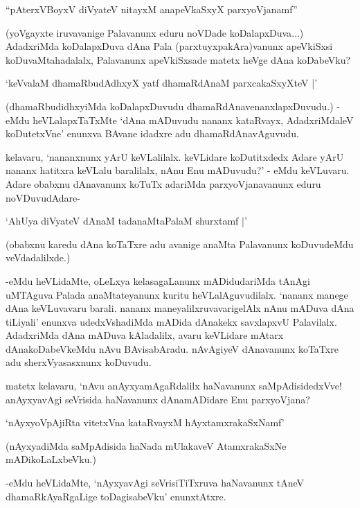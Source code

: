 \begin{shloka}
``pAterxVBoyxV diVyateV nitayxM anapeVkaSxyX parxyoVjanamf''
\end{shloka}

(yoVgayxte iruvavanige Palavanunx eduru noVDade koDalapxDuva$\ldots$) AdadxriMda koDalapxDuva dAna Pala (parxtuyxpakAra)vanunx apeVkiSxsi koDuvaMtahadalalx, Palavanunx apeVkiSxsade matetx heVge dAna koDabeVku?

\begin{shloka}
`keVvalaM dhamaRbudAdhxyX yatf dhamaRdAnaM parxcakaSxyXteV |'
\end{shloka}

(dhamaRbudidhxyiMda koDalapxDuvudu dhamaRdAnavenanxlapxDuvudu.) - eMdu heVLalapxTaTxMte `dAna mADuvudu nananx kataRvayx, AdadxriMdaleV koDutetxVne' enunxva BAvane idadxre adu dhamaRdAnavAguvudu.

kelavaru, `nananxnunx yArU keVLalilalx. keVLidare koDutitxdedx Adare yArU nananx hatitxra keVLalu baralilalx, nAnu Enu mADuvudu?' - eMdu keVLuvaru. Adare obabxnu dAnavanunx koTuTx adariMda parxyoVjanavanunx eduru noVDuvudAdare-

\begin{shloka}
`AhUya diVyateV dAnaM tadanaMtaPalaM shurxtamf |'
\end{shloka}

(obabxnu karedu dAna koTaTxre adu avanige anaMta Palavanunx koDuvudeMdu veVdadalilxde.)

-eMdu heVLidaMte, oLeLxya kelasagaLanunx mADidudariMda tAnAgi uMTAguva Palada anaMtateyanunx kuritu heVLalAguvudilalx. `nananx manege dAna keVLuvavaru barali. nananx maneyalilxruvavarigelAlx nAnu mADuva dAna tiLiyali' enunxva udedxVshadiMda mADida dAnakekx savxlapxvU Palavilalx. AdadxriMda dAna mADuva kAladalilx, avaru keVLidare mAtarx dAnakoDabeVkeMdu nAvu BAvisabAradu. nAvAgiyeV dAnavanunx koTaTxre adu sherxVyasasxnunx koDuvudu.

matetx kelavaru, `nAvu anAyxyamAgaRdalilx haNavanunx saMpAdisidedxVve! anAyxyavAgi seVrisida haNavanunx dAnamADidare Enu parxyoVjana?

\begin{shloka}
`nAyxyoVpAjiRta vitetxVna kataRvayxM hAyxtamxrakaSxNamf'
\end{shloka}

(nAyxyadiMda saMpAdisida haNada mUlakaveV AtamxrakaSxNe mADikoLaLxbeVku.)

-eMdu heVLidaMte, `nAyxyavAgi seVrisiTiTxruva haNavanunx tAneV dhamaRkAyaRgaLige toDagisabeVku' enunxtAtxre.

